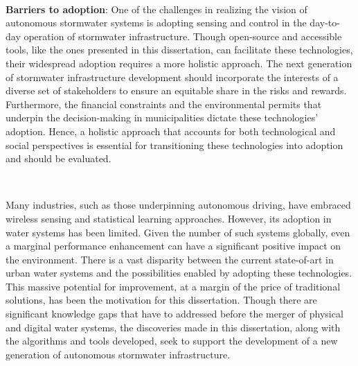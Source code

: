 \

\textbf{Barriers to adoption}: One of the challenges in realizing the vision of autonomous stormwater systems is adopting sensing and control in the day-to-day operation of stormwater infrastructure.
Though open-source and accessible tools, like the ones presented in this dissertation, can facilitate these technologies, their widespread adoption requires a more holistic approach.
The next generation of stormwater infrastructure development should incorporate the interests of a diverse set of stakeholders to ensure an equitable share in the risks and rewards.
Furthermore, the financial constraints and the environmental permits that underpin the decision-making in municipalities dictate these technologies’ adoption.
Hence, a holistic approach that accounts for both technological and social perspectives is essential for transitioning these technologies into adoption and should be evaluated.

\

Many industries, such as those underpinning autonomous driving, have embraced wireless sensing and statistical learning approaches.
However, its adoption in water systems has been limited. Given the number of such systems globally, even a marginal performance enhancement can have a significant positive impact on the environment.
There is a vast disparity between the current state-of-art in urban water systems and the possibilities enabled by adopting these technologies.
This massive potential for improvement, at a margin of the price of traditional solutions, has been the motivation for this dissertation.
Though there are significant knowledge gaps that have to addressed before the merger of physical and digital water systems, the discoveries made in this dissertation, along with the algorithms and tools developed, seek to support the development of a new generation of autonomous stormwater infrastructure.
